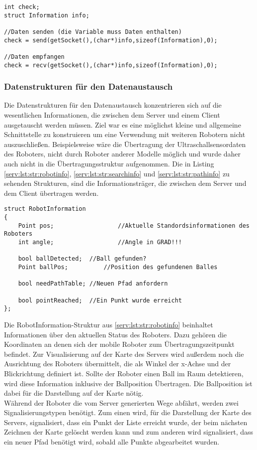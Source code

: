 \begin{lstlisting}[frame=tb,captionpos=b,caption=Senden und Empfangen., label=serv:lst:sendenempfangen]
int check;
struct Information info;

//Daten senden (die Variable muss Daten enthalten)
check = send(getSocket(),(char*)info,sizeof(Information),0);

//Daten empfangen
check = recv(getSocket(),(char*)info,sizeof(Information),0);
\end{lstlisting}

\subsubsection{Datenstrukturen für den Datenaustausch}\label{serv:datenstrukturen}

Die Datenstrukturen für den Datenaustausch konzentrieren sich auf die wesentlichen Informationen, die zwischen dem Server und einem Client ausgetauscht werden müssen. Ziel war es eine möglichst kleine und allgemeine Schnittstelle zu konstruieren um eine Verwendung mit weiteren Robotern nicht auszuschließen. Beispielsweise wäre die Übertragung der Ultraschallsensordaten des Roboters, nicht durch Roboter anderer Modelle möglich und wurde daher auch nicht in die Übertragungsstruktur aufgenommen. Die in Listing \ref{serv:lst:str:robotinfo}, \ref{serv:lst:str:searchinfo} und \ref{serv:lst:str:pathinfo}  zu sehenden Strukturen, sind die Informationsträger, die zwischen dem Server und dem Client übertragen werden.

\begin{lstlisting}[frame=tb,captionpos=b,caption=Datenstruktur RobotInformation., label=serv:lst:str:robotinfo]
struct RobotInformation
{			
	Point pos;					//Aktuelle Standordsinformationen des Roboters
	int angle;					//Angle in GRAD!!!

	bool ballDetected;	//Ball gefunden?
	Point ballPos;			//Position des gefundenen Balles

	bool needPathTable; //Neuen Pfad anfordern

	bool pointReached; 	//Ein Punkt wurde erreicht
};
\end{lstlisting}

Die RobotInformation-Struktur aus \ref{serv:lst:str:robotinfo} beinhaltet Informationen über den aktuellen Status des Roboters. Dazu gehören die Koordinaten an denen sich der mobile Roboter zum Übertragungszeitpunkt befindet. Zur Visualisierung auf der Karte des Servers wird außerdem noch die Ausrichtung des Roboters übermittelt, die als Winkel der x-Achse und der Blickrichtung definiert ist. Sollte der Roboter einen Ball im Raum detektieren, wird diese Information inklusive der Ballposition Übertragen. Die Ballposition ist dabei für die Darstellung auf der Karte nötig.\\ Während der Roboter die vom Server generierten Wege abfährt, werden zwei Signalisierungstypen benötigt. Zum einen wird, für die Darstellung der Karte des Servers, signalisiert, dass ein Punkt der Liste erreicht wurde, der beim nächsten Zeichnen der Karte gelöscht werden kann und zum anderen wird signalisiert, dass ein neuer Pfad benötigt wird, sobald alle Punkte abgearbeitet wurden. 

